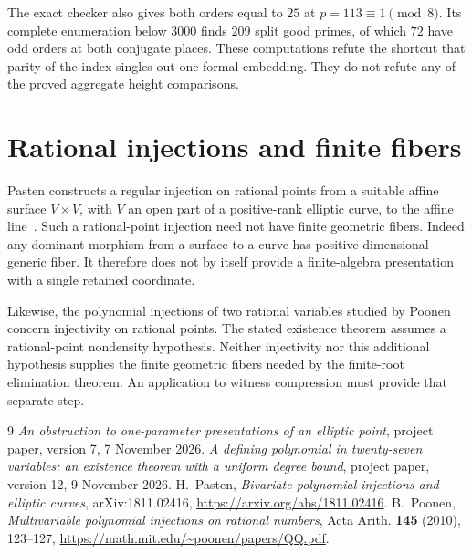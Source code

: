 \documentclass[11pt,a4paper]{article}
\theoremstyle{remark}\newtheorem{remark}[theorem]{Remark}
\begin{document}
The exact checker also gives both orders equal to $25$ at
$p=113\equiv1\pmod8$.  Its complete enumeration below $3000$
finds $209$ split good primes, of which $72$ have odd orders
at both conjugate places.  These computations refute the
shortcut that parity of the index singles out one formal
embedding.  They do not refute any of the proved aggregate
height comparisons.

\section{Rational injections and finite fibers}

Pasten constructs a regular injection on rational points from
a suitable affine surface $V\times V$, with $V$ an open part
of a positive-rank elliptic curve, to the affine line~\cite{Pasten}.
Such a rational-point injection need not have finite geometric
fibers.  Indeed any dominant morphism from a surface to a curve
has positive-dimensional generic fiber.  It therefore does not
by itself provide a finite-algebra presentation with a single
retained coordinate.

Likewise, the polynomial injections of two rational variables
studied by Poonen~\cite{Poonen} concern injectivity on rational
points.  The stated existence theorem assumes a rational-point
nondensity hypothesis.  Neither injectivity nor this additional
hypothesis supplies the finite geometric fibers needed by the
finite-root elimination theorem.  An application to witness
compression must provide that separate step.

\begin{thebibliography}{9}
\emph{An obstruction to one-parameter presentations of an elliptic point},
project paper, version 7, 7 November 2026.
\emph{A defining polynomial in twenty-seven variables:
an existence theorem with a uniform degree bound},
project paper, version 12, 9 November 2026.
H.~Pasten, \emph{Bivariate polynomial injections and elliptic curves},
arXiv:1811.02416, \url{https://arxiv.org/abs/1811.02416}.
B.~Poonen, \emph{Multivariable polynomial injections on rational numbers},
Acta Arith. \textbf{145} (2010), 123--127,
\url{https://math.mit.edu/~poonen/papers/QQ.pdf}.
\end{thebibliography}
\end{document}

